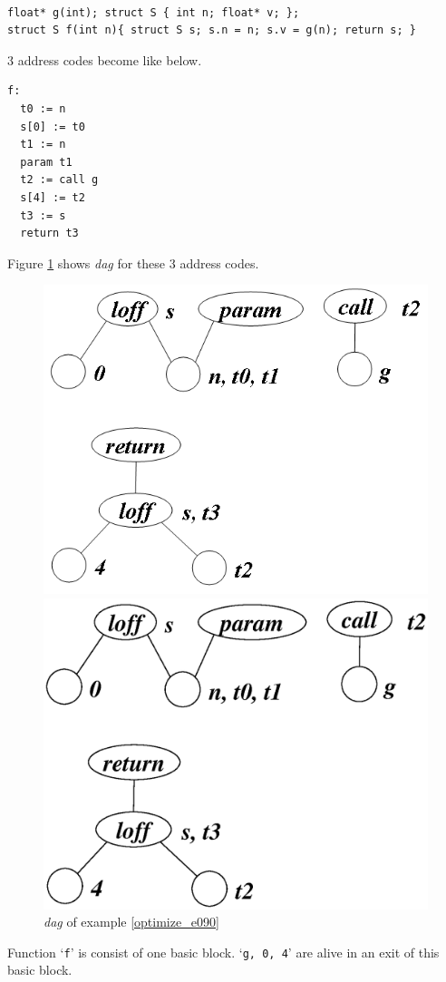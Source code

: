 \begin{Example}
\label{optimize_e091}
\begin{verbatim}

float* g(int); struct S { int n; float* v; };
struct S f(int n){ struct S s; s.n = n; s.v = g(n); return s; }
\end{verbatim}
3 address codes become like below.
\begin{verbatim}
f:
  t0 := n
  s[0] := t0
  t1 := n
  param t1
  t2 := call g
  s[4] := t2
  t3 := s
  return t3
\end{verbatim}
Figure \ref{optimize_e096} shows {\em dag} for these 3 address codes.
\begin{figure}[htbp]
\begin{center}
\begin{htmlonly}
\includegraphics[width=0.8\linewidth,height=0.648\linewidth]{opt039.png}
\end{htmlonly}
\begin{latexonly}
\includegraphics[width=0.8\linewidth,height=0.648\linewidth]{opt039.eps}
\end{latexonly}
\caption{{\em dag} of example \ref{optimize_e090}}
\label{optimize_e096}
\end{center}
\end{figure}
Function `{\tt{f}}' is consist of one basic block.
`{\tt{g, 0, 4}}' are
alive in an exit of this basic block.


\end{Example}

